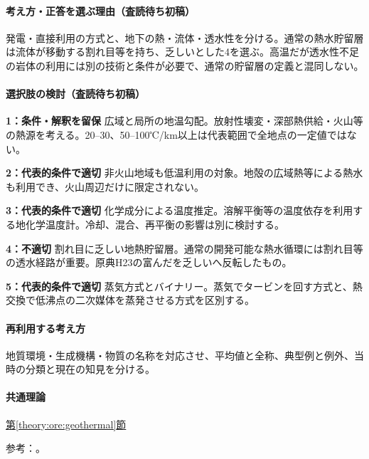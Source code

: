 \paragraph{考え方・正答を選ぶ理由（査読待ち初稿）} 発電・直接利用の方式と、地下の熱・流体・透水性を分ける。通常の熱水貯留層は流体が移動する割れ目等を持ち、乏しいとした4を選ぶ。高温だが透水性不足の岩体の利用には別の技術と条件が必要で、通常の貯留層の定義と混同しない。

\paragraph{選択肢の検討（査読待ち初稿）}\mbox{}\par

\noindent\textbf{1：条件・解釈を留保} 広域と局所の地温勾配。放射性壊変・深部熱供給・火山等の熱源を考える。20–30、50–100℃/km以上は代表範囲で全地点の一定値ではない。\par

\noindent\textbf{2：代表的条件で適切} 非火山地域も低温利用の対象。地殻の広域熱等による熱水も利用でき、火山周辺だけに限定されない。\par

\noindent\textbf{3：代表的条件で適切} 化学成分による温度推定。溶解平衡等の温度依存を利用する地化学温度計。冷却、混合、再平衡の影響は別に検討する。\par

\noindent\textbf{4：不適切} 割れ目に乏しい地熱貯留層。通常の開発可能な熱水循環には割れ目等の透水経路が重要。原典H23の富んだを乏しいへ反転したもの。\par

\noindent\textbf{5：代表的条件で適切} 蒸気方式とバイナリー。蒸気でタービンを回す方式と、熱交換で低沸点の二次媒体を蒸発させる方式を区別する。\par

\paragraph{再利用する考え方} 地質環境・生成機構・物質の名称を対応させ、平均値と全称、典型例と例外、当時の分類と現在の知見を分ける。

\paragraph{共通理論} \hyperref[theory:ore:geothermal]{第\ref*{theory:ore:geothermal}節}

\par 参考：\cite{ore50_geothermal_ref,ore50_reservoir_ref}。

